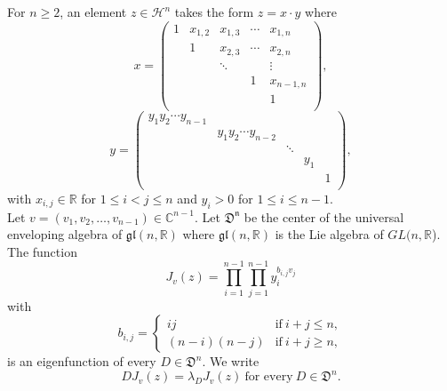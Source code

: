 \documentclass[sn-mathphys,Numbered]{sn-jnl}
\theoremstyle{thmstyleone}%
\theoremstyle{thmstyletwo}%
\theoremstyle{thmstylethree}%
\begin{document}
\noindent
For $n \geq 2$, an element $z \in \mathcal{H}^n$ takes the form $z=x \cdot y$ where 
$$ x= 
\begin{pmatrix}
1 & x_{1,2} & x_{1,3} & \cdots & x_{1,n} \\
  & 1          & x_{2,3} & \cdots & x_{2,n} \\
  &            &  \ddots  &         & \vdots \\
  &            &            & 1       & x_{n-1,n} \\
  &            &            &          & 1 \\
\end{pmatrix} 
, $$
$$ y=
\begin{pmatrix}
y_1y_2 \cdots y_{n-1} &                                  &           &      & \\
                               & y_1 y_2 \cdots y_{n-2}  &           &      & \\
                               &                                  & \ddots &      & \\
                               &                                  &          & y_1 & \\
                               &                                  &          &       & 1 \\
\end{pmatrix},
$$
with $x_{i,j} \in \mathbb{R}$ for $1 \leq i < j \leq n$ and $y_i>0$ for $1 \leq i \leq n-1$. \\

\noindent
Let $v=(v_1,v_2,\dots,v_{n-1}) \in \mathbb{C}^{n-1}$. Let $\mathfrak{D^n}$ be the center of the universal enveloping algebra of $\mathfrak{gl}(n,\mathbb{R})$ where $\mathfrak{gl}(n,\mathbb{R})$ is the Lie algebra of $GL(n,\mathbb{R}$). The function
$$ J_v(z) = \prod_{i=1}^{n-1} \prod_{j=1}^{n-1} y_i^{b_{i,j}v_j} $$
with 
$$ b_{i,j}=
\begin{cases}
ij & \text{if} \ i+j \leq n, \\
(n-i)(n-j) & \text{if} \ i+j \geq n, 
\end{cases}
$$
is an eigenfunction of every $D \in \mathfrak{D}^n$. We write 
$$ D J_v(z) = \lambda_D J_v(z) \ \text{for every} \ D \in \mathfrak{D}^n. $$ \\
\end{document}
